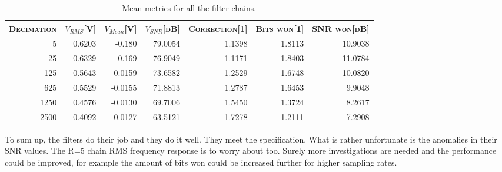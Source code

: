 \begin{table}
    \centering
    \caption{Mean metrics for all the filter chains.}
    \label{tab:verification:results}
    \begin{tabular}{rrrrrrr}
        \toprule
        \scshape Decimation & \scshape $V_{RMS}$[\si{V}] & \scshape $V_{Mean}$[\si{V}] & \scshape $V_{SNR}$[\si{dB}] & \scshape Correction[\si{1}] & \scshape Bits won[\si{1}] & \scshape SNR won[\si{dB}] \\
        \midrule
        5           & 0.6203   & -0.180    & 79.0054   & 1.1398   & 1.8113   & 10.9038\\
        25          & 0.6329   & -0.169    & 76.9049   & 1.1171   & 1.8403   & 11.0784\\
        125         & 0.5643   & -0.0159   & 73.6582   & 1.2529   & 1.6748   & 10.0820\\
        625         & 0.5529   & -0.0155   & 71.8813   & 1.2787   & 1.6453   & 9.9048\\
        1250        & 0.4576   & -0.0130   & 69.7006   & 1.5450   & 1.3724   & 8.2617\\
        2500        & 0.4092   & -0.0127   & 63.5121   & 1.7278   & 1.2111   & 7.2908\\
        \bottomrule
    \end{tabular}
\end{table}


To sum up, the filters do their job and they do it well. They meet the specification.
What is rather unfortunate is the anomalies in their SNR values. The R=5 chain RMS frequency response is to worry about too.
Surely more investigations are needed and the performance could be improved, for example the amount of bits won could be increased further for higher sampling rates.